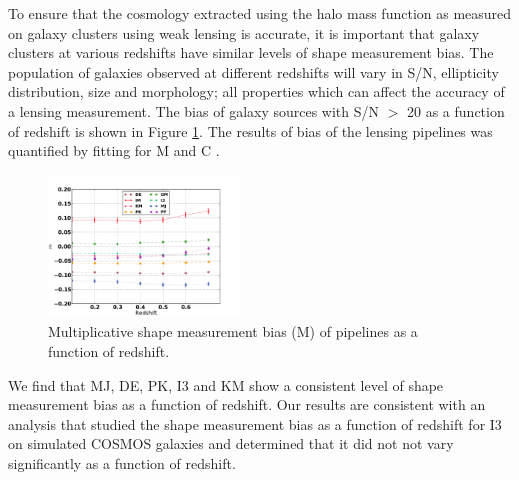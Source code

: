 To ensure that the cosmology extracted using the
halo mass function as measured on galaxy clusters
using weak lensing is accurate, it is important that
galaxy clusters at various redshifts have 
similar levels of shape measurement bias. The population of 
galaxies observed at different redshifts will vary in
S/N, ellipticity distribution, size and morphology;
all properties which can affect the accuracy of a lensing 
measurement. The bias of galaxy sources with S/N $>$ 
20 as a function of redshift is shown in Figure \ref{fig:red}.
The results of bias of the lensing pipelines was quantified 
by fitting for M and C . 

\begin{figure}
 \centering  %
  \includegraphics[width=0.45\textwidth]{fig/Mvalred_mfix.pdf} 
  \caption{Multiplicative shape measurement
  bias (M) of pipelines as a function of redshift.}
\label{fig:red}
\end{figure}
We find that MJ, DE, PK, I3 and KM
show a consistent level of shape measurement bias as a function of 
redshift. Our results are consistent with an analysis 
that studied the shape measurement bias as a function of redshift for I3 
\citep{K_2} on simulated COSMOS galaxies
and determined that it did not not vary significantly as a function
of redshift. 

